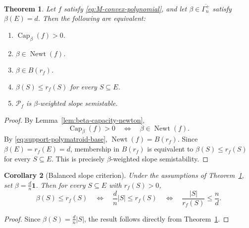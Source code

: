 \documentclass[oneside,english,letterpaper]{amsart}
\numberwithin{equation}{section}
\theoremstyle{plain}
\newtheorem{thm}{Theorem}[section]
\newtheorem{cor}[thm]{Corollary}
\theoremstyle{definition}
\theoremstyle{remark}
\def\one{\mathbf{1}}
\def\Newt{\operatorname{Newt}}
\def\Capacity{\operatorname{Cap}}
\begin{document}
\begin{thm}
\label{thm:capacity-polymatroid-stability}
Let \(f\) satisfy \eqref{eq:M-convex-polynomial}, and let
\(\beta\in\overline{\Gamma_n^+}\) satisfy \(\beta(E)=d\). Then the
following are equivalent:
\begin{enumerate}[label=\textnormal{(\arabic*)}]
\item \(\Capacity_\beta(f)>0\).
\item \(\beta\in\Newt(f)\).
\item \(\beta\in B(r_f)\).
\item \(\beta(S)\leq r_f(S)\) for every \(S\subseteq E\).
\item \(\mathcal P_f\) is
\(\beta\)-weighted slope semistable.
\end{enumerate}
\end{thm}
\begin{proof}
By Lemma~\ref{lem:beta-capacity-newton},
\[
\Capacity_\beta(f)>0
\quad\Longleftrightarrow\quad
\beta\in\Newt(f).
\]
By \eqref{eq:support-polymatroid-base},
\(\Newt(f)=B(r_f)\). Since \(\beta(E)=r_f(E)=d\), membership in
\(B(r_f)\) is equivalent to
\(\beta(S)\leq r_f(S)\) for every \(S\subseteq E\).  This is precisely
\(\beta\)-weighted slope semistability.
\end{proof}
\begin{cor}[Balanced slope criterion]
\label{cor:balanced-polymatroid-stability}
Under the assumptions of
Theorem~\ref{thm:capacity-polymatroid-stability}, set
\(\beta=\frac{d}{n}\one\). Then for every \(S \subseteq E\) with \(r_f(S)>0\), \[ \beta(S)\leq r_f(S) \quad\Longleftrightarrow\quad \frac{d}{n}|S|\leq r_f(S) \quad\Longleftrightarrow\quad \frac{|S|}{r_f(S)}\leq\frac{n}{d}. \] \end{cor}
\begin{proof}
Since \(\beta(S)=\frac{d}{n}|S|\), the result follows directly from
Theorem~\ref{thm:capacity-polymatroid-stability}.
\end{proof}
\end{document}
